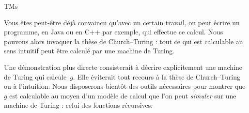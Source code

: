 \documentclass[../../../include/open-logic-section]{subfiles}
\begin{document}
\begin{tagblock}{TMs}
\begin{digress}
Vous êtes peut-être déjà convaincu qu'avec un certain travail,
on peut écrire un programme, en Java ou en C++ par exemple,
qui effectue ce calcul. Nous pouvons alors invoquer la thèse
de Church--Turing : tout ce qui est calculable au sens intuitif
peut être calculé par une machine de Turing.

Une démonstration plus directe consisterait à décrire explicitement
une machine de Turing qui calcule~$g$. Elle éviterait tout recours
à la thèse de Church--Turing ou à l'intuition. Nous disposerons
bientôt des outils nécessaires pour montrer que $g$ est calculable
au moyen d'un modèle de calcul que l'on peut \emph{simuler} sur
une machine de Turing : celui des fonctions récursives.
\end{digress}
\end{tagblock}
\end{document}
